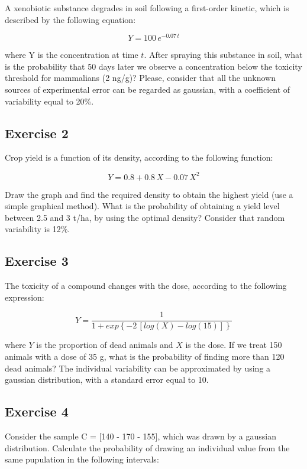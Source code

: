 \documentclass[a4paper,12pt,oneside]{book}
\begin{document}
A xenobiotic substance degrades in soil following a first-order kinetic, which is described by the following equation:

\[Y = 100 \, e^{-0.07 \, t}\]

where Y is the concentration at time \(t\). After spraying this substance in soil, what is the probability that 50 days later we observe a concentration below the toxicity threshold for mammalians (2 ng/g)? Please, consider that all the unknown sources of experimental error can be regarded as gaussian, with a coefficient of variability equal to 20\%.

\hypertarget{exercise-2-2}{%
\subsection{Exercise 2}\label{exercise-2-2}}

Crop yield is a function of its density, according to the following function:

\[ Y = 0.8 + 0.8 \, X - 0.07 \, X^2\]

Draw the graph and find the required density to obtain the highest yield (use a simple graphical method). What is the probability of obtaining a yield level between 2.5 and 3 t/ha, by using the optimal density? Consider that random variability is 12\%.

\hypertarget{exercise-3-2}{%
\subsection{Exercise 3}\label{exercise-3-2}}

The toxicity of a compound changes with the dose, according to the following expression:

\[ Y = \frac{1}{1 + exp\left\{ -2 \, \left[log(X) - log(15)\right] \right\}}\]

where \(Y\) is the proportion of dead animals and \(X\) is the dose. If we treat 150 animals with a dose of 35 g, what is the probability of finding more than 120 dead animals? The individual variability can be approximated by using a gaussian distribution, with a standard error equal to 10.

\hypertarget{exercise-4}{%
\subsection{Exercise 4}\label{exercise-4}}

Consider the sample C = {[}140 - 170 - 155{]}, which was drawn by a gaussian distribution. Calculate the probability of drawing an individual value from the same pupulation in the following intervals:
\end{document}
